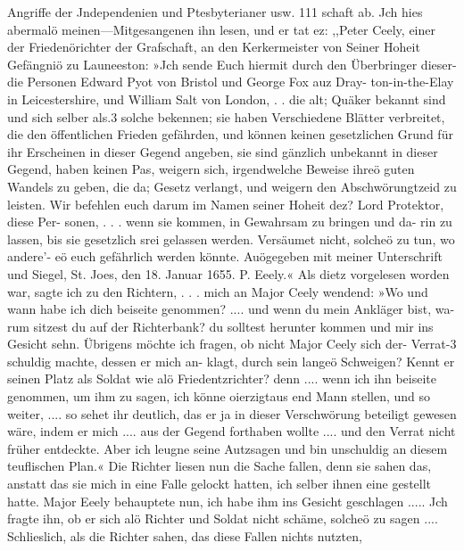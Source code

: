 Angriffe der Jndependenien und Ptesbyterianer usw. 111
schaft ab. Jch hies abermalö meinen—Mitgesangenen ihn lesen,
und er tat ez:
,,Peter Ceely, einer der Friedenörichter der Grafschaft, an
den Kerkermeister von Seiner Hoheit Gefängniö zu Launeeston:
»Jch sende Euch hiermit durch den Überbringer dieser- die
Personen Edward Pyot von Bristol und George Fox auz Dray-
ton-in-the-Elay in Leicestershire, und William Salt von London, . .
die alt; Quäker bekannt sind und sich selber als.3 solche bekennen;
sie haben Verschiedene Blätter verbreitet, die den öffentlichen
Frieden gefährden, und können keinen gesetzlichen Grund für ihr
Erscheinen in dieser Gegend angeben, sie sind gänzlich unbekannt
in dieser Gegend, haben keinen Pas, weigern sich, irgendwelche
Beweise ihreö guten Wandels zu geben, die da; Gesetz verlangt,
und weigern den Abschwörungtzeid zu leisten. Wir befehlen euch
darum im Namen seiner Hoheit dez? Lord Protektor, diese Per-
sonen, . . . wenn sie kommen, in Gewahrsam zu bringen und da-
rin zu lassen, bis sie gesetzlich srei gelassen werden. Versäumet
nicht, solcheö zu tun, wo andere'- eö euch gefährlich werden könnte.
Auögegeben mit meiner Unterschrift und Siegel, St. Joes, den
18. Januar 1655. P. Eeely.«
Als dietz vorgelesen worden war, sagte ich zu den Richtern, . . .
mich an Major Ceely wendend: »Wo und wann habe ich dich
beiseite genommen? .... und wenn du mein Ankläger bist, wa-
rum sitzest du auf der Richterbank? du solltest herunter kommen
und mir ins Gesicht sehn. Übrigens möchte ich fragen, ob nicht
Major Ceely sich der- Verrat-3 schuldig machte, dessen er mich an-
klagt, durch sein langeö Schweigen? Kennt er seinen Platz als
Soldat wie alö Friedentzrichter? denn .... wenn ich ihn beiseite
genommen, um ihm zu sagen, ich könne oierzigtaus end Mann stellen,
und so weiter, .... so sehet ihr deutlich, das er ja in dieser
Verschwörung beteiligt gewesen wäre, indem er mich .... aus
der Gegend forthaben wollte .... und den Verrat nicht früher
entdeckte. Aber ich leugne seine Autzsagen und bin unschuldig an
diesem teuflischen Plan.« Die Richter liesen nun die Sache fallen,
denn sie sahen das, anstatt das sie mich in eine Falle gelockt hatten,
ich selber ihnen eine gestellt hatte. Major Eeely behauptete nun,
ich habe ihm ins Gesicht geschlagen ..... Jch fragte ihn, ob er
sich alö Richter und Soldat nicht schäme, solcheö zu sagen ....
Schlieslich, als die Richter sahen, das diese Fallen nichts nutzten,


